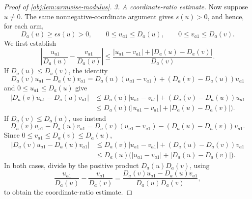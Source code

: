 \begin{proof}[Proof of \cref{obj:lem:armwise-modulus}]
\emph{3. A coordinate-ratio estimate.}
Now suppose \(u\neq0\). The same nonnegative-coordinate argument gives \(s(u)>0\), and hence, for each arm,
\[
D_a(u)\geq\epsilon s(u)>0,\qquad
0\leq u_{a1}\leq D_a(u),\qquad
0\leq v_{a1}\leq D_a(v).
\]
We first establish
\[
\left|\frac{u_{a1}}{D_a(u)}-\frac{v_{a1}}{D_a(v)}\right|
\leq
\frac{|u_{a1}-v_{a1}|+|D_a(u)-D_a(v)|}{D_a(v)}.
\]
If \(D_a(u)\leq D_a(v)\), the identity
\[
D_a(v)u_{a1}-D_a(u)v_{a1}
=
D_a(u)(u_{a1}-v_{a1})
+(D_a(v)-D_a(u))u_{a1}
\]
and \(0\leq u_{a1}\leq D_a(u)\) give
\[
\begin{aligned}
|D_a(v)u_{a1}-D_a(u)v_{a1}|
&\leq D_a(u)|u_{a1}-v_{a1}|
 +(D_a(v)-D_a(u))u_{a1}\\
&\leq D_a(u)
 \bigl(|u_{a1}-v_{a1}|+|D_a(u)-D_a(v)|\bigr).
\end{aligned}
\]
If \(D_a(v)\leq D_a(u)\), use instead
\[
D_a(v)u_{a1}-D_a(u)v_{a1}
=
D_a(v)(u_{a1}-v_{a1})
-(D_a(u)-D_a(v))v_{a1}.
\]
Since \(0\leq v_{a1}\leq D_a(v)\leq D_a(u)\),
\[
\begin{aligned}
|D_a(v)u_{a1}-D_a(u)v_{a1}|
&\leq D_a(v)|u_{a1}-v_{a1}|
 +(D_a(u)-D_a(v))v_{a1}\\
&\leq D_a(u)
 \bigl(|u_{a1}-v_{a1}|+|D_a(u)-D_a(v)|\bigr).
\end{aligned}
\]
In both cases, divide by the positive product \(D_a(u)D_a(v)\), using
\[
\frac{u_{a1}}{D_a(u)}-\frac{v_{a1}}{D_a(v)}
=
\frac{D_a(v)u_{a1}-D_a(u)v_{a1}}{D_a(u)D_a(v)},
\]
to obtain the coordinate-ratio estimate.


\end{proof}
